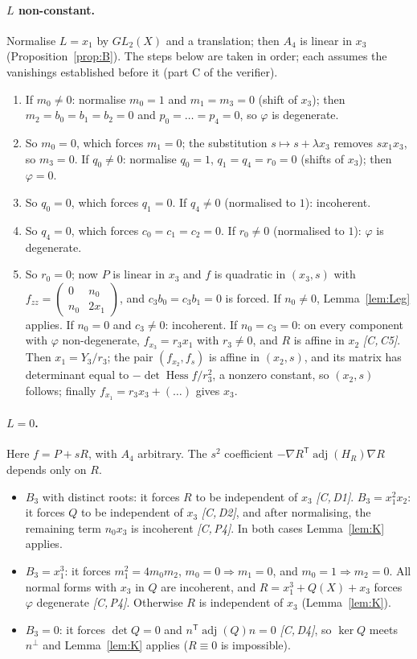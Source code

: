 \documentclass[11pt]{article}
\theoremstyle{remark}
\newcommand{\Hess}{\operatorname{Hess}}
\newcommand{\adj}{\operatorname{adj}}
\newcommand{\cert}[1]{\emph{[C,\,#1]}}
\begin{document}
\paragraph{$L$ non-constant.} Normalise $L=x_1$ by $GL_2(X)$ and a translation; then $A_4$ is linear in $x_3$ (Proposition~\ref{prop:B}). The steps below are taken in order; each assumes the vanishings established before it (part C of the verifier).
\begin{enumerate}
\item[C1] If $m_0\ne0$: normalise $m_0=1$ and $m_1=m_3=0$ (shift of $x_3$); then $m_2=b_0=b_1=b_2=0$ and $p_0=\dots=p_4=0$, so $\varphi$ is degenerate.
\item[C2] So $m_0=0$, which forces $m_1=0$; the substitution $s\mapsto s+\lambda x_3$ removes $sx_1x_3$, so $m_3=0$. If $q_0\ne0$: normalise $q_0=1$, $q_1=q_4=r_0=0$ (shifts of $x_3$); then $\varphi=0$.
\item[C3] So $q_0=0$, which forces $q_1=0$. If $q_4\ne0$ (normalised to $1$): incoherent.
\item[C4] So $q_4=0$, which forces $c_0=c_1=c_2=0$. If $r_0\ne0$ (normalised to $1$): $\varphi$ is degenerate.
\item[C5] So $r_0=0$; now $P$ is linear in $x_3$ and $f$ is quadratic in $(x_3,s)$ with $f_{zz}=\begin{pmatrix}0&n_0\\ n_0&2x_1\end{pmatrix}$, and $c_3b_0=c_3b_1=0$ is forced. If $n_0\ne0$, Lemma~\ref{lem:Leg} applies. If $n_0=0$ and $c_3\ne0$: incoherent. If $n_0=c_3=0$: on every component with $\varphi$ non-degenerate, $f_{x_3}=r_3x_1$ with $r_3\ne0$, and $R$ is affine in $x_2$ \cert{C5}. Then $x_1=Y_3/r_3$; the pair $(f_{x_2},f_s)$ is affine in $(x_2,s)$, and its matrix has determinant equal to $-\det\Hess f/r_3^2$, a nonzero constant, so $(x_2,s)$ follows; finally $f_{x_1}=r_3x_3+(\dots)$ gives $x_3$.
\end{enumerate}

\paragraph{$L=0$.} Here $f=P+sR$, with $A_4$ arbitrary. The $s^2$ coefficient $-\nabla R^{\mathsf T}\adj(H_R)\nabla R$ depends only on $R$.
\begin{itemize}
\item $B_3$ with distinct roots: it forces $R$ to be independent of $x_3$ \cert{D1}. $B_3=x_1^2x_2$: it forces $Q$ to be independent of $x_3$ \cert{D2}, and after normalising, the remaining term $n_0x_3$ is incoherent \cert{P4}. In both cases Lemma~\ref{lem:K} applies.
\item $B_3=x_1^3$: it forces $m_1^2=4m_0m_2$, $m_0=0\Rightarrow m_1=0$, and $m_0=1\Rightarrow m_2=0$. All normal forms with $x_3$ in $Q$ are incoherent, and $R=x_1^3+Q(X)+x_3$ forces $\varphi$ degenerate \cert{P4}. Otherwise $R$ is independent of $x_3$ (Lemma~\ref{lem:K}).
\item $B_3=0$: it forces $\det Q=0$ and $n^{\mathsf T}\adj(Q)n=0$ \cert{D4}, so $\ker Q$ meets $n^\perp$ and Lemma~\ref{lem:K} applies ($R\equiv0$ is impossible).
\end{itemize}
\end{document}
